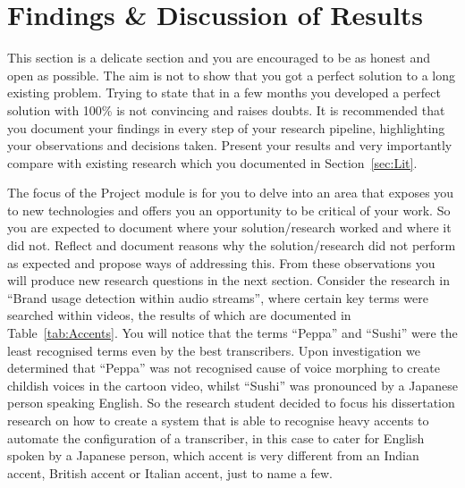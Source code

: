 \section{Findings \& Discussion of Results}
\label{sec:Fin}
\par This section is a delicate section and you are encouraged to be as honest and open as possible. The aim is not to show that you got a perfect solution to a long existing problem. Trying to state that in a few months you developed a perfect solution with 100\% is not convincing and raises doubts. It is recommended that you document your findings in every step of your research pipeline, highlighting your observations and decisions taken. Present your results and very importantly compare with existing research which you documented in Section~\ref{sec:Lit}. 

\par The focus of the Project module is for you to delve into an area that exposes you to new technologies and offers you an opportunity to be critical of your work. So you are expected to document where your solution/research worked and where it did not. Reflect and document reasons why the solution/research did not perform as expected and propose ways of addressing this. From these observations you will produce new research questions in the next section. Consider the research in \enquote{Brand usage detection within audio streams}, where certain key terms were searched within videos, the results of which are documented in Table~\ref{tab:Accents}. You will notice that the terms \enquote{Peppa} and \enquote{Sushi} were the least recognised terms even by the best transcribers. Upon investigation we determined that \enquote{Peppa} was not recognised cause of voice morphing to create childish voices in the cartoon video, whilst \enquote{Sushi} was pronounced by a Japanese person speaking English. So the research student decided to focus his dissertation research on how to create a system that is able to recognise heavy accents to automate the configuration of a transcriber, in this case to cater for English spoken by a Japanese person, which accent is very different from an Indian accent, British accent or Italian accent, just to name a few.

